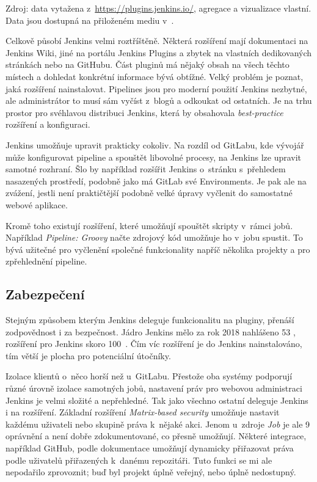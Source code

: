 {\begin{iffigure}
                \caption{Zdroj: data vytažena z~\url{https://plugins.jenkins.io/}, agregace a vizualizace vlastní. Data jsou dostupná na přiloženém mediu v~.}
            \end{iffigure}
            \clearpage
        }

        Celkově působí Jenkins velmi roztříštěně. Některá rozšíření mají dokumentaci na Jenkins Wiki, jiné na portálu Jenkins Plugins a zbytek na vlastních dedikovaných stránkách nebo na GitHubu. Část pluginů má nějaký obsah na všech těchto místech a dohledat konkrétní informace bývá obtížné. Velký problém je poznat, jaká rozšíření nainstalovat. Pipelines jsou pro moderní použití Jenkins nezbytné, ale administrátor to musí sám vyčíst z~blogů a odkoukat od ostatních. Je na trhu prostor pro svéhlavou distribuci Jenkins, která by obsahovala \textit{best-practice} rozšíření a konfiguraci.

        Jenkins umožňuje upravit prakticky cokoliv. Na rozdíl od GitLabu, kde vývojář může konfigurovat pipeline a spouštět libovolné procesy, na Jenkins lze upravit samotné rozhraní. Šlo by například rozšířit Jenkins o~stránku s~přehledem nasazených prostředí, podobně jako má GitLab své Environments. Je pak ale na zvážení, jestli není praktičtější podobně velké úpravy vyčlenit do samostatné webové aplikace.

        Kromě toho existují rozšíření, které umožňují spouštět skripty v~rámci jobů. Například \textit{Pipeline: Groovy} načte zdrojový kód umožňuje ho v~jobu spustit. To bývá užitečné pro vyčlenění společné funkcionality napříč několika projekty a pro zpřehlednění pipeline.

    \subsection{Zabezpečení}
        Stejným způsobem kterým Jenkins deleguje funkcionalitu na pluginy, přenáší zodpovědnost i za bezpečnost. Jádro Jenkins mělo za rok 2018 nahlášeno 53 , rozšíření pro Jenkins skoro 100~\cite{cve-jenkins}. Čím víc rozšíření je do Jenkins nainstalováno, tím větší je plocha pro potenciální útočníky.

        Izolace klientů o~něco horší než u~GitLabu. Přestože oba systémy podporují různé úrovně izolace samotných jobů, nastavení práv pro webovou administraci Jenkins je velmi složité a nepřehledné. Tak jako všechno ostatní deleguje Jenkins i  na rozšíření. Základní rozšíření \textit{Matrix-based security} umožňuje nastavit každému uživateli nebo skupině práva k~nějaké akci. Jenom u~zdroje \textit{Job} je ale 9 oprávnění a není dobře zdokumentované, co přesně umožňují. Některé integrace, například GitHub, podle dokumentace umožňují dynamicky přiřazovat práva podle uživatelů přiřazených k~danému repozitáři. Tuto funkci se mi ale nepodařilo zprovoznit; buď byl projekt úplně veřejný, nebo úplně nedostupný.

